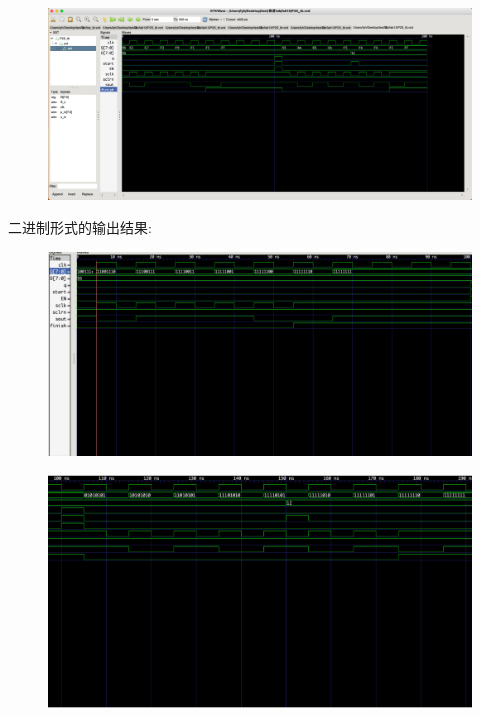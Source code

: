 \documentclass{article}
\begin{document}
\begin{figure}[H]
    \centering
    \includegraphics[width=1\textwidth]{t5.png}
    
    \end{figure}


二进制形式的输出结果:
\begin{figure}[H]
    \centering
    \includegraphics[width=1\textwidth]{t2.png}
    
    \end{figure}

    \begin{figure}[H]
        \centering
        \includegraphics[width=1\textwidth]{t3.png}
        
        \end{figure}
\end{document}
